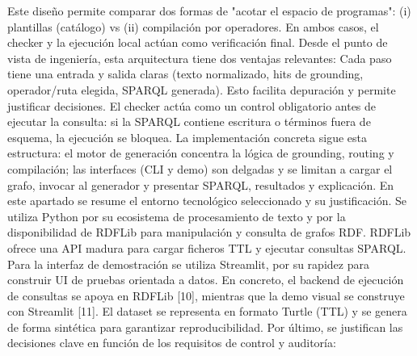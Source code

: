 \markdownRendererUlEndTight \markdownRendererInterblockSeparator
{}Este diseño permite comparar dos formas de "acotar el espacio de programas": (i) plantillas (catálogo) vs (ii) compilación por operadores. En ambos casos, el checker y la ejecución local actúan como verificación final.\markdownRendererInterblockSeparator
{}Desde el punto de vista de ingeniería, esta arquitectura tiene dos ventajas relevantes:\markdownRendererInterblockSeparator
{}\markdownRendererUlBeginTight
\markdownRendererUlItem {} Cada paso tiene una entrada y salida claras (texto normalizado, hits de grounding, operador/ruta elegida, SPARQL generada). Esto facilita depuración y permite justificar decisiones.\markdownRendererUlItemEnd 
\markdownRendererUlItem {} El checker actúa como un control obligatorio antes de ejecutar la consulta: si la SPARQL contiene escritura o términos fuera de esquema, la ejecución se bloquea.\markdownRendererUlItemEnd 
\markdownRendererUlEndTight \markdownRendererInterblockSeparator
{}La implementación concreta sigue esta estructura: el motor de generación concentra la lógica de grounding, routing y compilación; las interfaces (CLI y demo) son delgadas y se limitan a cargar el grafo, invocar al generador y presentar SPARQL, resultados y explicación.\markdownRendererInterblockSeparator
{}\markdownRendererInterblockSeparator
{}En este apartado se resume el entorno tecnológico seleccionado y su justificación. Se utiliza Python por su ecosistema de procesamiento de texto y por la disponibilidad de RDFLib para manipulación y consulta de grafos RDF. RDFLib ofrece una API madura para cargar ficheros TTL y ejecutar consultas SPARQL. Para la interfaz de demostración se utiliza Streamlit, por su rapidez para construir UI de pruebas orientada a datos.\markdownRendererInterblockSeparator
{}En concreto, el backend de ejecución de consultas se apoya en RDFLib [10], mientras que la demo visual se construye con Streamlit [11].\markdownRendererInterblockSeparator
{}El dataset se representa en formato Turtle (TTL) y se genera de forma sintética para garantizar reproducibilidad.\markdownRendererInterblockSeparator
{}\markdownRendererInterblockSeparator
{}Por último, se justifican las decisiones clave en función de los requisitos de control y auditoría:\markdownRendererInterblockSeparator
{}\markdownRendererUlBeginTight
